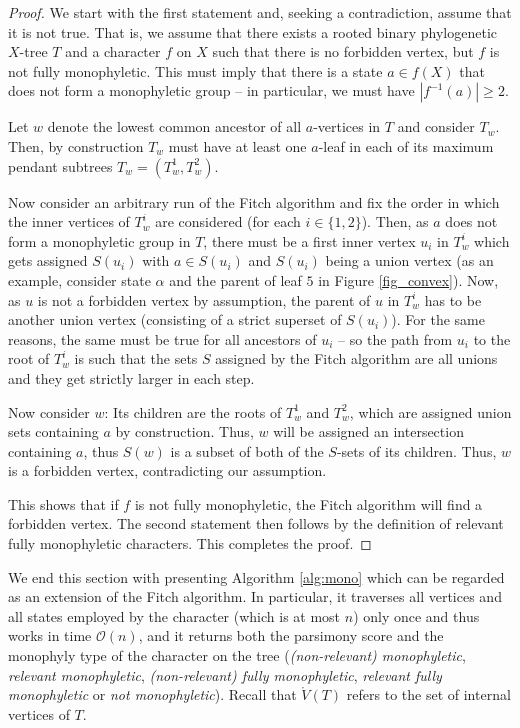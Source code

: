 \documentclass{amsart}
\theoremstyle{definition}
\begin{document}
\begin{proof} We start with the first statement and, seeking a contradiction, assume that it is not true. That is, we assume that there exists a rooted binary phylogenetic $X$-tree $T$ and a character $f$ on $X$ such that there is no forbidden vertex, but $f$ is not fully monophyletic. This must imply that there is a state $a\in f(X)$ that does not form a monophyletic group -- in particular, we must have $|f^{-1}(a)|\geq 2$. 

Let $w$ denote the lowest common ancestor of all $a$-vertices in $T$ and consider $T_w$. Then, by construction $T_w$ must have at least one $a$-leaf in each of its maximum pendant subtrees $T_w=(T_w^1,T_w^2)$.

Now consider an arbitrary run of the Fitch algorithm and fix the order in which the inner vertices of $T_w^i$ are considered (for each $i\in \{1,2\}$). Then, as $a$ does not form a monophyletic group in $T$, there must be a first inner vertex $u_i$ in $T_w^i$ which gets assigned $S(u_i)$ with $a\in S(u_i)$ and $S(u_i)$ being a union vertex (as an example, consider state $\alpha$
and the parent of leaf $5$ in Figure \ref{fig_convex}). Now, as $u$ is not a forbidden vertex by assumption, the parent of $u$ in $T_w^i$ has to be another union vertex (consisting of a strict superset of $S(u_i)$). For the same reasons, the same must be true for all ancestors of $u_i$ -- so the path from $u_i$ to the root of $T_w^i$ is such that the sets $S$ assigned by the Fitch algorithm are all unions and they get strictly larger in each step. 

Now consider $w$: Its children are the roots of $T_w^1$ and $T_w^2$, which are assigned union sets containing $a$ by construction. Thus, $w$ will be assigned an intersection containing $a$, thus $S(w)$ is a subset of both of the $S$-sets of its children. Thus, $w$ is a forbidden vertex, contradicting our assumption.

This shows that if $f$ is not fully monophyletic, the Fitch algorithm will find a forbidden vertex. The second statement then follows by the definition of relevant fully monophyletic characters. This completes the proof.
\end{proof}


We end this section with presenting Algorithm \ref{alg:mono} which can be regarded as an extension of the Fitch algorithm. In particular, it traverses all vertices and all states employed by the character (which is at most $n$) only once and thus works in time $\mathcal{O}(n)$, and it returns both the parsimony score and the monophyly type of the character on the tree (\emph{(non-relevant) monophyletic}, \emph{relevant monophyletic}, \emph{(non-relevant) fully monophyletic}, \emph{relevant fully monophyletic} or \emph{not monophyletic}). Recall that $\mathring{V}(T)$ refers to the set of internal vertices of $T$.
\end{document}
